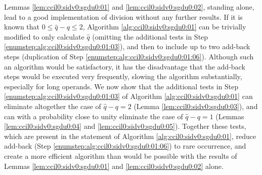 Lemmas \ref{lem:ccil0:sidv0:sgdu0:01} and
\ref{lem:ccil0:sidv0:sgdu0:02}, 
standing alone, lead to a good implementation of 
division without any further results.  If it is known that
$0 \leq \hat{q} - q \leq 2$, Algorithm \ref{alg:ccil0:sidv0:sgdu0:01}
can be trivially modified to only calculate
$\hat{q}$ (omitting the additional tests in Step \ref{enumstep:alg:ccil0:sidv0:sgdu0:01:03}), 
and then
to include up to two add-back steps
(duplication of Step \ref{enumstep:alg:ccil0:sidv0:sgdu0:01:06}).  
Although such an algorithm would be 
satisfactory, it has the disadvantage that the add-back steps would
be executed very frequently, slowing the algorithm substantially, especially
for long operands.
We now show that the additional tests in Step \ref{enumstep:alg:ccil0:sidv0:sgdu0:01:03} of 
Algorithm \ref{alg:ccil0:sidv0:sgdu0:01} can eliminate 
altogether the case of $\hat{q}-q = 2$ (Lemma \ref{lem:ccil0:sidv0:sgdu0:03}), and 
can with a probability close to unity eliminate the
case of $\hat{q}-q = 1$ (Lemmas \ref{lem:ccil0:sidv0:sgdu0:04} 
and \ref{lem:ccil0:sidv0:sgdu0:05}).  Together these tests, which are present in 
the statement of Algorithm \ref{alg:ccil0:sidv0:sgdu0:01},
reduce add-back (Step \ref{enumstep:alg:ccil0:sidv0:sgdu0:01:06}) to rare occurrence, and create a more
efficient algorithm than would be possible with the
results of Lemmas \ref{lem:ccil0:sidv0:sgdu0:01} and \ref{lem:ccil0:sidv0:sgdu0:02} alone.

